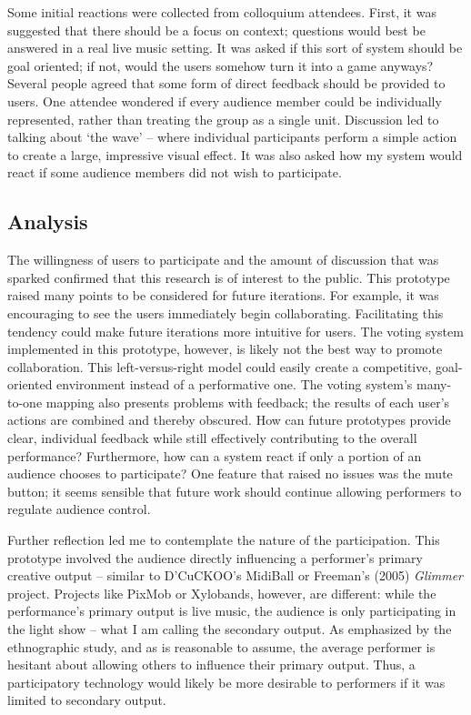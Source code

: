Some initial reactions were collected from colloquium attendees. First, it was suggested that there should be a focus on context; questions would best be answered in a real live music setting. It was asked if this sort of system should be goal oriented; if not, would the users somehow turn it into a game anyways? Several people agreed that some form of direct feedback should be provided to users. One attendee wondered if every audience member could be individually represented, rather than treating the group as a single unit. Discussion led to talking about `the wave' -- where individual participants perform a simple action to create a large, impressive visual effect. It was also asked how my system would react if some audience members did not wish to participate.

\subsection{Analysis}

The willingness of users to participate and the amount of discussion that was sparked confirmed that this research is of interest to the public. This prototype raised many points to be considered for future iterations. For example, it was encouraging to see the users immediately begin collaborating. Facilitating this tendency could make future iterations more intuitive for users. The voting system implemented in this prototype, however, is likely not the best way to promote collaboration. This left-versus-right model could easily create a competitive, goal-oriented environment instead of a performative one. The voting system's many-to-one mapping also presents problems with feedback; the results of each user's actions are combined and thereby obscured. How can future prototypes provide clear, individual feedback while still effectively contributing to the overall performance? Furthermore, how can a system react if only a portion of an audience chooses to participate? One feature that raised no issues was the mute button; it seems sensible that future work should continue allowing performers to regulate audience control.

Further reflection led me to contemplate the nature of the participation. This prototype involved the audience directly influencing a performer's primary creative output -- similar to D'CuCKOO's MidiBall or Freeman's (2005) \textit{Glimmer} project. Projects like PixMob or Xylobands, however, are different: while the performance's primary output is live music, the audience is only participating in the light show -- what I am calling the secondary output. As emphasized by the ethnographic study, and as is reasonable to assume, the average performer is hesitant about allowing others to influence their primary output. Thus, a participatory technology would likely be more desirable to performers if it was limited to secondary output.

